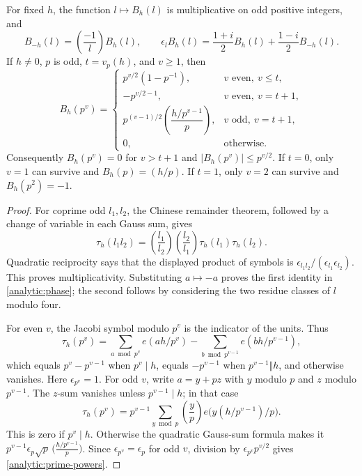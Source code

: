 \begin{lemma}\label{analytic:gauss}
For fixed $h$, the function $l\mapsto B_h(l)$ is multiplicative on odd
positive integers, and
\begin{equation}\label{analytic:phase}
 B_{-h}(l)=\left(\frac{-1}{l}\right)B_h(l),\qquad
 \epsilon_l B_h(l)=\frac{1+i}{2}B_h(l)+\frac{1-i}{2}B_{-h}(l).
\end{equation}
If $h\ne0$, $p$ is odd, $t=v_p(h)$, and $v\geq1$, then
\begin{equation}\label{analytic:prime-powers}
 B_h(p^v)=
 \begin{cases}
 p^{v/2}(1-p^{-1}),&v\text{ even},\ v\leq t,\\
 -p^{v/2-1},&v\text{ even},\ v=t+1,\\
 p^{(v-1)/2}\left(\dfrac{h/p^{v-1}}p\right),
       &v\text{ odd},\ v=t+1,\\
 0,&\text{otherwise}.
 \end{cases}
\end{equation}
Consequently $B_h(p^v)=0$ for $v>t+1$ and
$|B_h(p^v)|\leq p^{v/2}$. If $t=0$, only $v=1$ can survive and
$B_h(p)=(h/p)$. If $t=1$, only $v=2$ can survive and
$B_h(p^2)=-1$.
\end{lemma}

\begin{proof}
For coprime odd $l_1,l_2$, the Chinese remainder theorem, followed by a
change of variable in each Gauss sum, gives
\[
 \tau_h(l_1l_2)=
 \left(\frac{l_1}{l_2}\right)\left(\frac{l_2}{l_1}\right)
 \tau_h(l_1)\tau_h(l_2).
\]
Quadratic reciprocity says that the displayed product of symbols is
$\epsilon_{l_1l_2}/(\epsilon_{l_1}\epsilon_{l_2})$. This proves
multiplicativity. Substituting $a\mapsto-a$ proves the first identity
in \eqref{analytic:phase}; the second follows by considering the two
residue classes of $l$ modulo four.

For even $v$, the Jacobi symbol modulo $p^v$ is the indicator of the
units. Thus
\[
 \tau_h(p^v)=\sum_{a\bmod p^v}e(ah/p^v)
             -\sum_{b\bmod p^{v-1}}e(bh/p^{v-1}),
\]
which equals $p^v-p^{v-1}$ when $p^v\mid h$, equals $-p^{v-1}$ when
$p^{v-1}\Vert h$, and otherwise vanishes. Here $\epsilon_{p^v}=1$.
For odd $v$, write $a=y+pz$ with $y$ modulo $p$ and $z$ modulo
$p^{v-1}$. The $z$-sum vanishes unless $p^{v-1}\mid h$; in that case
\[
 \tau_h(p^v)=p^{v-1}\sum_{y\bmod p}
       \left(\frac yp\right)e\big(y(h/p^{v-1})/p\big).
\]
This is zero if $p^v\mid h$. Otherwise the quadratic Gauss-sum formula
makes it
$p^{v-1}\epsilon_p\sqrt p\,\bigl(\frac{h/p^{v-1}}p\bigr)$.
Since $\epsilon_{p^v}=\epsilon_p$ for odd $v$, division by
$\epsilon_{p^v}p^{v/2}$ gives \eqref{analytic:prime-powers}.
\end{proof}

